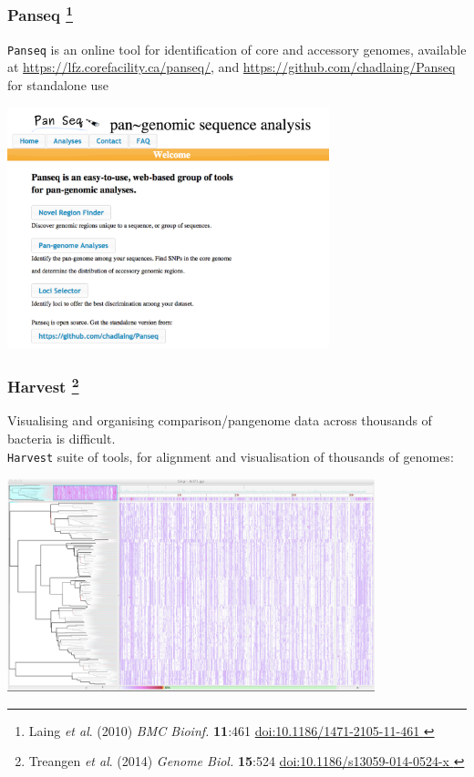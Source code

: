 \begin{frame}
  \frametitle{Panseq
  \footnote{\tiny{Laing \textit{et al}. (2010) \textit{BMC Bioinf.} \textbf{11}:461 \href{http://dx.doi.org/10.1186/1471-2105-11-461}{doi:10.1186/1471-2105-11-461
  }}}
  }
  \texttt{Panseq} is an online tool for identification of core and accessory genomes, available at \href{https://lfz.corefacility.ca/panseq/}{https://lfz.corefacility.ca/panseq/}, and \href{https://github.com/chadlaing/Panseq}{https://github.com/chadlaing/Panseq} for standalone use
  \begin{center}
      \includegraphics[width=0.7\textwidth]{images/panseq} 
  \end{center}
\end{frame}

%
\begin{frame}
  \frametitle{Harvest
  \footnote{\tiny{Treangen \textit{et al}. (2014) \textit{Genome Biol.} \textbf{15}:524 \href{http://dx.doi.org/10.1186/s13059-014-0524-x}{doi:10.1186/s13059-014-0524-x
  }}}
  }
  Visualising and organising comparison/pangenome data across thousands of bacteria is difficult.\\
  \texttt{Harvest} suite of tools, for alignment and visualisation of thousands of genomes:
  \begin{center}
      \includegraphics[width=0.8\textwidth]{images/harvest} 
  \end{center}
\end{frame}
